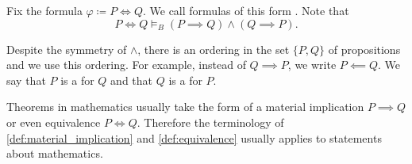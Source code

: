 \begin{definition}\label{def:equivalence}
  Fix the formula \( \varphi \coloneqq P \iff Q \). We call formulas of this form . Note that
  \begin{equation*}
    P \iff Q \models_B (P \implies Q) \land (Q \implies P).
  \end{equation*}

   Despite the symmetry of \( \land \), there is an ordering in the set \( \{ P, Q \} \) of propositions and we use this ordering. For example, instead of \( Q \implies P \), we write \( P \impliedby Q \). We say that \( P \) is a  for \( Q \) and that \( Q \) is a  for \( P \).
\end{definition}

\begin{remark}\label{remark:statements_as_implications}
  Theorems in mathematics usually take the form of a material implication \( P \implies Q \) or even equivalence \( P \iff Q \). Therefore the terminology of \cref{def:material_implication} and \cref{def:equivalence} usually applies to statements about mathematics.
\end{remark}
